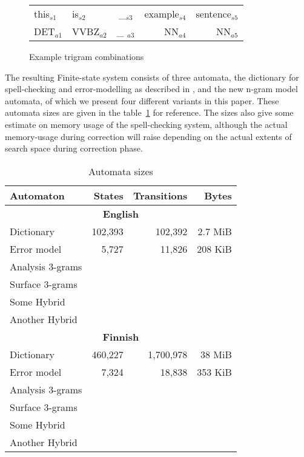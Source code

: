 \documentclass[11pt,a4paper]{article}
\begin{document}
\begin{figure}[h]
\begin{centering}
\caption{Example trigram combinations\label{fig:example}}
\begin{scriptsize}
\begin{tabular}{llcrr}
\hline
this$_{s1}$ & is$_{s2}$ & \_$_{s3}$ & example$_{s4}$ & sentence$_{s5}$\\
DET$_{a1}$ & VVBZ$_{a2}$ & \_ $_{a3}$& NN$_{a4}$ & NN$_{a5}$\\
\hline
\end{tabular}
\end{scriptsize}
\end{centering}
\end{figure}

The resulting Finite-state system consists of three automata, the dictionary
for spell-checking and error-modelling as described in
, and the new n-gram model automata, of which
we present four different variants in this paper. These automata sizes are given
in the table~\ref{table:sizes} for reference. The sizes also give some estimate
on memory usage of the spell-checking system, although the actual memory-usage
during correction will raise depending on the actual extents of search space
during correction phase.

\begin{table}
\begin{centering}
\caption{Automata sizes\label{table:sizes}}
\begin{scriptsize}
\begin{tabular}{lrrr}
    Automaton & States & Transitions & Bytes \\
    \hline
    \multicolumn{4}{c}{\textbf{English}} \\
    \hline
    Dictionary & 102,393 & 102,392 & 2.7 MiB \\
    Error model & 5,727 & 11,826 & 208 KiB \\
    \hline
    Analysis 3-grams & & & \\
    Surface 3-grams & & & \\
    Some Hybrid & & & \\
    Another Hybrid & & & \\
    \hline
    \multicolumn{4}{c}{\textbf{Finnish}} \\
    \hline
    Dictionary & 460,227 & 1,700,978 & 38 MiB \\
    Error model & 7,324 & 18,838 & 353 KiB \\
    \hline
    Analysis 3-grams & & & \\
    Surface 3-grams & & & \\
    Some Hybrid & & & \\
    Another Hybrid & & & \\
    \hline
\end{tabular}
\end{scriptsize}
\end{centering}
\end{table}
\end{document}
